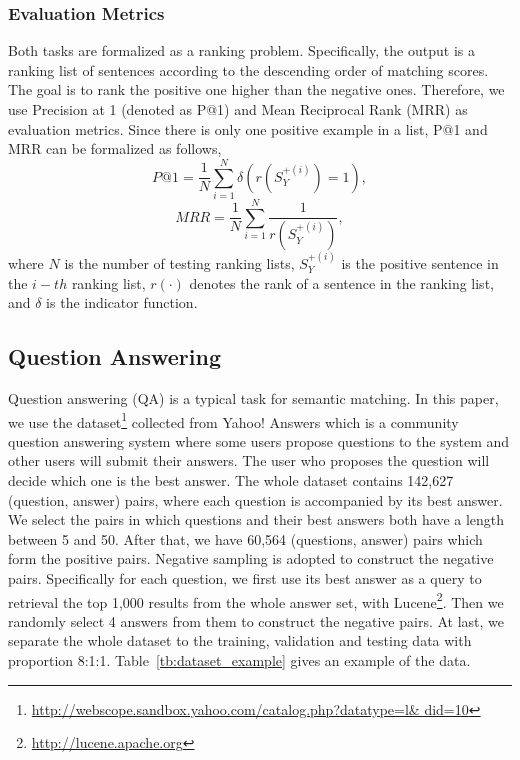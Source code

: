 \documentclass[letterpaper]{article}
\begin{document}
\subsubsection{Evaluation Metrics}
Both tasks are formalized as a ranking problem. Specifically, the output is a ranking list of sentences according to the descending order of matching scores. The goal is to rank the positive one higher than the negative ones. Therefore, we use Precision at 1 (denoted as P@1) and Mean Reciprocal Rank (MRR) as evaluation metrics. Since there is only one positive example in a list, P@1 and MRR can be formalized as follows,
$$ P@1=\frac{1}{N}\sum_{i=1}^{N}\delta(r(S_Y^{+(i)})= 1),$$
$$MRR=\frac{1}{N}\sum_{i=1}^{N}\frac{1}{r({S_{Y}^{+(i)}})},$$
where $N$ is the number of testing ranking lists, $S_Y^{+(i)}$ is the positive sentence in the $i-th$ ranking list, $r(\cdot)$ denotes the rank of a sentence in the ranking list, and $\delta$ is the indicator function.

\subsection{Question Answering}
Question answering (QA) is a typical task for semantic matching. In this paper, we use the dataset\footnote{\url{http://webscope.sandbox.yahoo.com/catalog.php?datatype=l& did=10}} collected from Yahoo! Answers which is a community question answering system where some users propose questions to the system and other users will submit their answers. The user who proposes the question will decide which one is the best answer. The whole dataset contains 142,627 (question, answer) pairs, where each question is accompanied by its best answer.  We select the pairs in which questions and their best answers both have a length between 5 and 50.
After that, we have 60,564 (questions, answer) pairs which form the positive pairs.
Negative sampling is adopted to construct the negative pairs.
Specifically for each question, we first use its best answer as a query to retrieval the top 1,000  results from the whole answer set, with Lucene\footnote{\url{http://lucene.apache.org}}. Then we randomly select 4 answers from them to construct the negative pairs.
At last, we separate the whole dataset to the training, validation and testing data with proportion 8:1:1. Table~\ref{tb:dataset_example} gives an example of the data.
\end{document}
